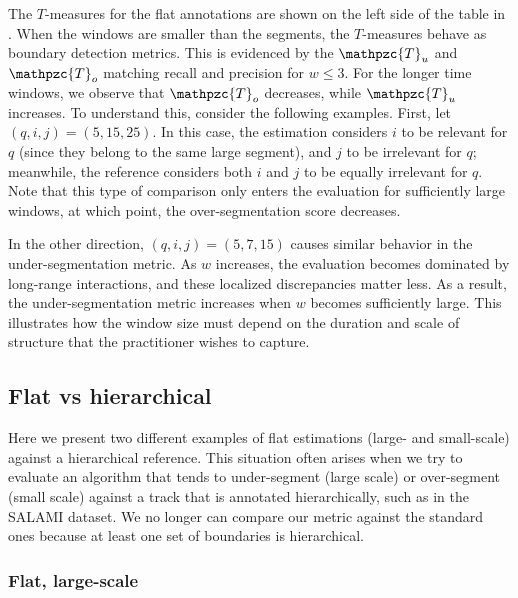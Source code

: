 \documentclass{article}
\def\shag{\ensuremath{\mathpzc{T}}}
\begin{document}
The $T$-measures for the flat annotations are shown on the left side of the table in .
When the windows are smaller than the segments, the $T$-measures behave as boundary detection metrics.
This is evidenced by the $\shag_u$ and $\shag_o$ matching recall and precision for $w \leq 3$.
For the longer time windows, we observe that $\shag_o$ decreases, while $\shag_u$ increases.
To understand this, consider the following examples.
First, let $(q,i,j) = (5,15,25)$.
In this case, the estimation considers $i$ to be relevant for $q$ (since they belong to the same large segment), and $j$ to be irrelevant for $q$; meanwhile, the reference considers both $i$ and $j$ to be equally irrelevant for $q$.
Note that this type of comparison only enters the evaluation for sufficiently large windows, at which point, the over-segmentation score decreases.  

In the other direction, $(q,i,j) = (5, 7, 15)$ causes similar behavior in the under-segmentation metric.
As $w$ increases, the evaluation becomes dominated by long-range interactions, and these localized discrepancies matter less.
As a result, the under-segmentation metric increases when $w$ becomes sufficiently large.
This illustrates how the window size must depend on the duration and scale of structure that the practitioner wishes to capture. 

\subsection{Flat vs hierarchical}

Here we present two different examples of flat estimations (large- and small-scale) against a hierarchical reference.
This situation often arises when we try to evaluate an algorithm that tends to under-segment (large scale) or over-segment (small scale) against a track that is annotated
hierarchically, such as in the SALAMI dataset.
We no longer can compare our metric against the standard ones because at least one set of boundaries is hierarchical.

\subsubsection{Flat, large-scale}
\end{document}
